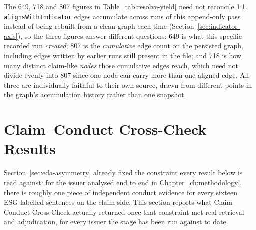\documentclass[fontsize=12pt,oneside,headings=small]{scrreprt}
\begin{document}
The 649, 718 and 807 figures in Table~\ref{tab:resolve-yield} need not reconcile 1:1. \texttt{alignsWithIndicator} edges accumulate across runs of this append-only pass instead of being rebuilt from a clean graph each time (Section~\ref{sec:indicator-axis}), so the three figures answer different questions: 649 is what this specific recorded run \emph{created}; 807 is the \emph{cumulative} edge count on the persisted graph, including edges written by earlier runs still present in the file; and 718 is how many distinct claim-like \emph{nodes} those cumulative edges reach, which need not divide evenly into 807 since one node can carry more than one aligned edge. All three are individually faithful to their own source, drawn from different points in the graph's accumulation history rather than one snapshot.

\section{Claim--Conduct Cross-Check Results}
\label{sec:experiment-crosscheck}

Section~\ref{sec:eda-asymmetry} already fixed the constraint every result below is read against: for the issuer analysed end to end in Chapter~\ref{ch:methodology}, there is roughly one piece of independent conduct evidence for every sixteen ESG-labelled sentences on the claim side. This section reports what Claim--Conduct Cross-Check actually returned once that constraint met real retrieval and adjudication, for every issuer the stage has been run against to date.
\end{document}
